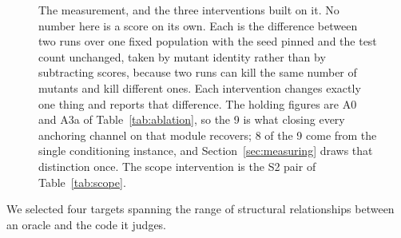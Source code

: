 \documentclass[12pt]{article}
\begin{document}
\begin{figure}[t]
\caption{The measurement, and the three interventions built on it. No number here
is a score on its own. Each is the difference between two runs over one fixed
population with the seed pinned and the test count unchanged, taken by mutant
identity rather than by subtracting scores, because two runs can kill the same
number of mutants and kill different ones. Each intervention changes exactly one
thing and reports that difference. The holding figures are A0 and A3a of
Table~\ref{tab:ablation}, so the 9 is what closing every anchoring channel on
that module recovers; 8 of the 9 come from the single conditioning instance, and
Section~\ref{sec:measuring} draws that distinction once. The scope
intervention is the S2 pair of Table~\ref{tab:scope}.}
\label{fig:method}
\end{figure}

We selected four targets spanning the range of structural relationships between
an oracle and the code it judges.
\end{document}

